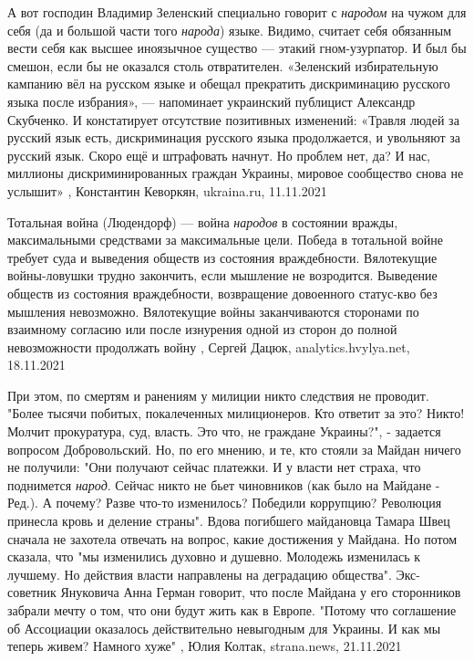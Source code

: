 А вот господин Владимир Зеленский специально говорит с \emph{народом} на чужом
для себя (да и большой части того \emph{народа}) языке. Видимо, считает себя
обязанным вести себя как высшее иноязычное существо — этакий гном-узурпатор. И
был бы смешон, если бы не оказался столь отвратителен.  «Зеленский
избирательную кампанию вёл на русском языке и обещал прекратить дискриминацию
русского языка после избрания», — напоминает украинский публицист Александр
Скубченко. И констатирует отсутствие позитивных изменений: «Травля людей за
русский язык есть, дискриминация русского языка продолжается, и увольняют за
русский язык. Скоро ещё и штрафовать начнут. Но проблем нет, да? И нас,
миллионы дискриминированных граждан Украины, мировое сообщество снова не
услышит»
, 
Константин Кеворкян, ukraina.ru, 11.11.2021

Тотальная война (Людендорф) — война \emph{народов} в состоянии вражды,
максимальными средствами за максимальные цели. Победа в тотальной войне требует
суда и выведения обществ из состояния враждебности.  Вялотекущие войны-ловушки
трудно закончить, если мышление не возродится.  Выведение обществ из состояния
враждебности, возвращение довоенного статус-кво без мышления невозможно.
Вялотекущие войны заканчиваются сторонами по взаимному согласию или после
изнурения одной из сторон до полной невозможности продолжать войну
, Сергей Дацюк, analytics.hvylya.net, 18.11.2021

При этом, по смертям и ранениям у милиции никто следствия не проводит. "Более
тысячи побитых, покалеченных милиционеров. Кто ответит за это? Никто! Молчит
прокуратура, суд, власть. Это что, не граждане Украины?", - задается вопросом
Добровольский.  Но, по его мнению, и те, кто стояли за Майдан ничего не
получили: "Они получают сейчас платежки. И у власти нет страха, что поднимется
\emph{народ}.  Сейчас никто не бьет чиновников (как было на Майдане - Ред.). А
почему? Разве что-то изменилось? Победили коррупцию? Революция принесла кровь и
деление страны".  Вдова погибшего майдановца Тамара Швец сначала не захотела
отвечать на вопрос, какие достижения у Майдана. Но потом сказала, что "мы
изменились духовно и душевно. Молодежь изменилась к лучшему. Но действия власти
направлены на деградацию общества".  Экс-советник Януковича Анна Герман
говорит, что после Майдана у его сторонников забрали мечту о том, что они будут
жить как в Европе. "Потому что соглашение об Ассоциации оказалось действительно
невыгодным для Украины. И как мы теперь живем? Намного хуже"
, 
Юлия Колтак, strana.news, 21.11.2021

